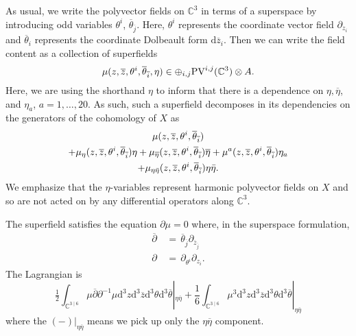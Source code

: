 \documentclass[11pt]{amsart}
\newcommand{\dbar}{\br{\partial}}
\newcommand{\zbar}{\br{z}}
\newcommand{\PV}{\op{PV}}
\newcommand{\br}{\overline}
\newcommand{\C}{\mathbb C}
\newcommand{\CC}{\mathbb C}
\renewcommand{\d}{\mathrm{d}}
\def\zbar{{\overline{z}}}
\def\PV{{\rm PV}}
\def\C{{\rm C}}
\newcommand{\op}{\operatorname}
\theoremstyle{thm}
\numberwithin{equation}{subsection}
\theoremstyle{def}
\theoremstyle{rem}
\begin{document}
As usual, we write the polyvector fields on $\CC^3$ in terms of a superspace by introducing odd variables $\theta^i$, $\br{\theta}_{\br{j}}$.  
Here, $\theta^i$ represents the coordinate vector field $\partial_{z_i}$ and $\br \theta_i$ represents the coordinate Dolbeault form $\d \zbar_i$. 
Then we can write the field content as a collection of superfields
\begin{equation} 
		\mu(z,\zbar,\theta^i, \br{\theta}_{\br{i}},\eta) \in \oplus_{i,j}  \PV^{i,j}(\CC^3) \otimes A .
\end{equation}
Here, we are using the shorthand $\eta$ to inform that there is a dependence on $\eta, \br{\eta}$, and $\eta_a$, $a=1,\ldots, 20$. 
As such, such a superfield decomposes in its dependencies on the generators of the cohomology of $X$ as
\begin{multline}
\mu(z,\zbar,\theta^i, \br{\theta}_{\br{i}}) \\
+ \mu_\eta (z,\zbar,\theta^i, \br{\theta}_{\br{i}}) \eta + \mu_{\br{\eta}} (z,\zbar,\theta^i, \br{\theta}_{\br{i}}) \br{\eta} + \mu^a (z,\zbar,\theta^i, \br{\theta}_{\br{i}}) \eta_a \\
+ \mu_{\eta \Bar{\eta}} (z,\zbar,\theta^i, \br{\theta}_{\br{i}}) \eta \Bar{\eta} .
\end{multline}
We emphasize that the $\eta$-variables represent harmonic polyvector fields on $X$ and so are not acted on by any differential operators along $\CC^3$. 

The superfield satisfies the equation $\partial \mu = 0$
where, in the superspace formulation,
\begin{align} 
	\dbar & \, = \, \br{\theta}_{\br{j}} \partial_{\zbar_{\br{j}}} \\
	\partial &\, = \, \partial_{\theta^i} \partial_{z_i}.  
\end{align}
	The Lagrangian is
	\begin{equation} 
		\tfrac{1}{2} \int_{\CC^{3 \mid 6}}  \mu \dbar \partial^{-1} \mu \d^3 z \d^3 \zbar \d^3 \theta \d^3 \br{\theta} |_{\eta \br{\eta}} + \frac{1}{6} \int_{\CC^{3 \mid 6}} \mu^3 \d^3 z \d^3 \zbar \d^3 \theta \d^3 \br{\theta} |_{\eta \br{\eta}}  
	\end{equation}
where the $(-)|_{\eta \br{\eta}}$ means we pick up only the $\eta \br{\eta}$ component.
\end{document}
